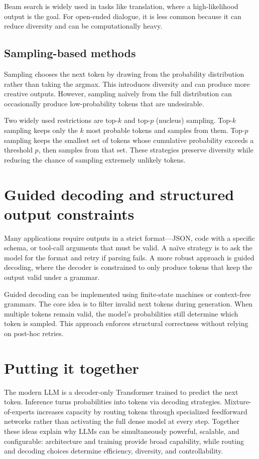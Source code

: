 Beam search is widely used in tasks like translation, where a high-likelihood output is the goal. For open-ended dialogue, it is less common because it can reduce diversity and can be computationally heavy.

\subsection{Sampling-based methods}
Sampling chooses the next token by drawing from the probability distribution rather than taking the argmax. This introduces diversity and can produce more creative outputs. However, sampling naïvely from the full distribution can occasionally produce low-probability tokens that are undesirable.

Two widely used restrictions are top-\(k\) and top-\(p\) (nucleus) sampling. Top-\(k\) sampling keeps only the \(k\) most probable tokens and samples from them. Top-\(p\) sampling keeps the smallest set of tokens whose cumulative probability exceeds a threshold \(p\), then samples from that set. These strategies preserve diversity while reducing the chance of sampling extremely unlikely tokens.

\section{Guided decoding and structured output constraints}
Many applications require outputs in a strict format—JSON, code with a specific schema, or tool-call arguments that must be valid. A naïve strategy is to ask the model for the format and retry if parsing fails. A more robust approach is guided decoding, where the decoder is constrained to only produce tokens that keep the output valid under a grammar.

Guided decoding can be implemented using finite-state machines or context-free grammars. The core idea is to filter invalid next tokens during generation. When multiple tokens remain valid, the model’s probabilities still determine which token is sampled. This approach enforces structural correctness without relying on post-hoc retries.

\section{Putting it together}
The modern LLM is a decoder-only Transformer trained to predict the next token. Inference turns probabilities into tokens via decoding strategies. Mixture-of-experts increases capacity by routing tokens through specialized feedforward networks rather than activating the full dense model at every step. Together these ideas explain why LLMs can be simultaneously powerful, scalable, and configurable: architecture and training provide broad capability, while routing and decoding choices determine efficiency, diversity, and controllability.

